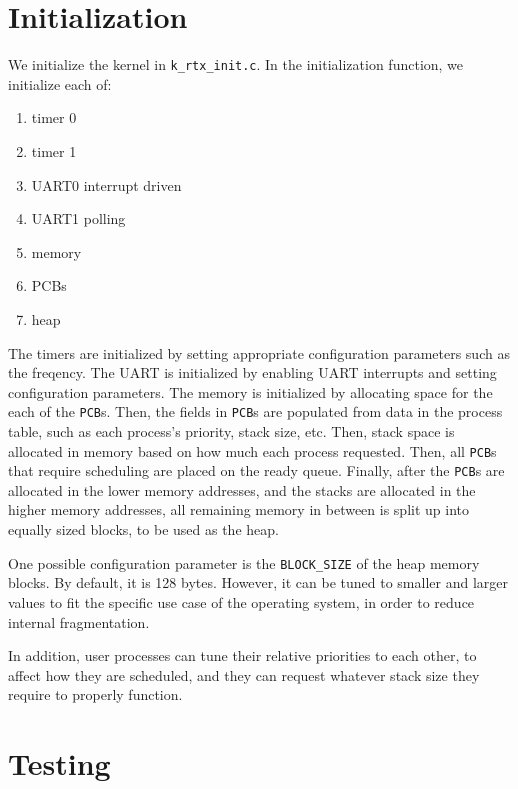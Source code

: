 \documentclass[12pt]{report}
\begin{document}

\section{Initialization}

We initialize the kernel in \texttt{k\_rtx\_init.c}. In the initialization function, we initialize each of:
\begin{enumerate}
	\item timer 0
	\item timer 1
	\item UART0 interrupt driven
	\item UART1 polling
	\item memory
	\item PCBs
	\item heap 
\end{enumerate}

The timers are initialized by setting appropriate configuration parameters such as the freqency. The UART is initialized by enabling UART interrupts and setting configuration parameters. The memory is initialized by allocating space for the each of the \texttt{PCB}s. Then, the fields in \texttt{PCB}s are populated from data in the process table, such as each process's priority, stack size, etc. Then, stack space is allocated in memory based on how much each process requested. Then, all \texttt{PCB}s that require scheduling are placed on the ready queue. Finally, after the \texttt{PCB}s are allocated in the lower memory addresses, and the stacks are allocated in the higher memory addresses, all remaining memory in between is split up into equally sized blocks, to be used as the heap. 

One possible configuration parameter is the \texttt{BLOCK_SIZE} of the heap memory blocks. By default, it is 128 bytes. However, it can be tuned to smaller and larger values to fit the specific use case of the operating system, in order to reduce internal fragmentation.

In addition, user processes can tune their relative priorities to each other, to affect how they are scheduled, and they can request whatever stack size they require to properly function.

\section{Testing}
\end{document}
